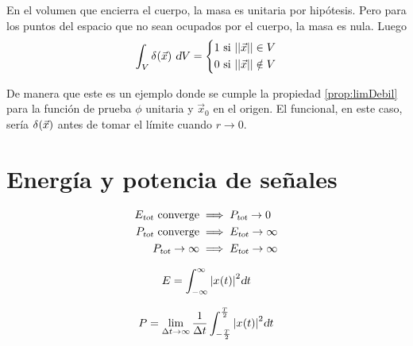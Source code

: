 \begin{mdframed}[style=MyFrame2]
    En el volumen que encierra el cuerpo, la masa es unitaria por hipótesis. Pero para los puntos del espacio que no sean ocupados por el cuerpo, la masa es nula. Luego
    \begin{equation*}
        \int_V \fx[\delta]{\Vec{x}} \, \dif V =
        \left\{
        \begin{aligned}
            1 \text{ si } \nnorm{\Vec{x}} \in V
            \\
            0 \text{ si } \nnorm{\Vec{x}} \notin V
        \end{aligned}
        \right.
    \end{equation*}

    De manera que este es un ejemplo donde se cumple la propiedad \ref{prop:limDebil} para la función de prueba $\phi$ unitaria y $\Vec{x}_0$ en el origen. El funcional, en este caso, sería $\fx[\delta]{\Vec{x}}$ antes de tomar el límite cuando $r \to 0$.
\end{mdframed}


\section{Energía y potencia de señales}

\begin{align*}
        \sub{E}{tot} \text{ converge} & \implies \sub{P}{tot} \to 0
        \\
        \sub{P}{tot} \text{ converge} & \implies \sub{E}{tot} \to \infty
        \\
        \sub{P}{tot} \to \infty & \implies \sub{E}{tot} \to \infty
    \end{align*}

\begin{mdframed}[style=MyFrame1]
    \begin{defn}
    \end{defn}
    \begin{equation*}
        E = \int_{-\infty}^{\infty} \norm{\fx[x]{t}}^2 \dif t
    \end{equation*}
\end{mdframed}

\begin{mdframed}[style=MyFrame1]
    \begin{defn}
    \end{defn}
    \begin{equation*}
        P = \lim_{\Delta t \to \infty} \frac{1}{\Delta t} \int_{-\frac{T}{2}}^{\frac{T}{2}} \norm{\fx[x]{t}}^2 \dif t
    \end{equation*}
\end{mdframed}


